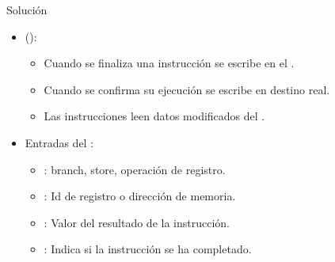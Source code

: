 \begin{frame}[t]{Solución}
\begin{itemize}
  \item {} ():
    \begin{itemize}
      \item Cuando se finaliza una instrucción se escribe en el .
      \item Cuando se confirma su ejecución se escribe en destino real.
      \item Las instrucciones leen datos modificados del .
    \end{itemize}

  \item Entradas del :
    \begin{itemize}
      \item {}: branch, store, operación de registro.
      \item {}: Id de registro o dirección de memoria.
      \item {}: Valor del resultado de la instrucción.
      \item {}: Indica si la instrucción se ha completado.
    \end{itemize}
\end{itemize}
\end{frame}
